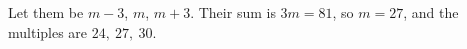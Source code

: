 Let them be $m-3$, $m$, $m+3$. Their sum is $3m=81$, so $m=27$, and the multiples are $\boxed{24,\ 27,\ 30}$.

